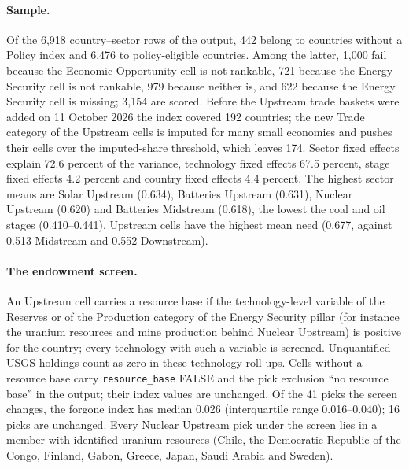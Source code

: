 \paragraph{Sample.} Of the 6,918 country--sector rows of the output, 442 belong to countries
without a Policy index and 6,476 to policy-eligible countries. Among the latter, 1,000 fail because
the Economic Opportunity cell is not rankable, 721 because the Energy Security cell is not
rankable, 979 because neither is, and 622 because the Energy Security cell is missing; 3,154 are
scored. Before the Upstream trade baskets were added on 11 October 2026 the index covered 192 countries;
the new Trade category of the Upstream cells is imputed for many small economies and pushes their
cells over the imputed-share threshold, which leaves 174. Sector fixed effects explain 72.6 percent
of the variance, technology fixed effects 67.5 percent, stage fixed effects 4.2 percent and country
fixed effects 4.4 percent. The highest sector means are Solar Upstream (0.634), Batteries Upstream
(0.631), Nuclear Upstream (0.620) and Batteries Midstream (0.618), the lowest the coal and oil
stages (0.410--0.441). Upstream cells have the highest mean need (0.677, against 0.513 Midstream and
0.552 Downstream).

\paragraph{The endowment screen.} An Upstream cell carries a resource base if the technology-level
variable of the Reserves or of the Production category of the Energy Security pillar (for instance
the uranium resources and mine production behind Nuclear Upstream) is positive for the country;
every technology with such a variable is screened. Unquantified USGS holdings count as zero in
these technology roll-ups. Cells without a resource base carry \texttt{resource\_base} FALSE and the
pick exclusion ``no resource base'' in the output; their index values are unchanged. Of the 41
picks the screen changes, the forgone index has median 0.026 (interquartile range 0.016--0.040);
16 picks are unchanged. Every Nuclear Upstream pick under the screen lies in a member with
identified uranium resources (Chile, the Democratic Republic of the Congo, Finland, Gabon, Greece,
Japan, Saudi Arabia and Sweden).


